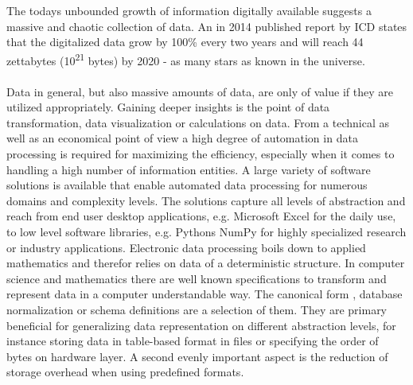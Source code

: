 The todays unbounded growth of information digitally available suggests a massive and chaotic collection of data. An in 2014 published report by ICD states that the digitalized data grow by 100\% every two years and will reach 44 zettabytes (10\textsuperscript{21} bytes) by 2020 - as many stars as known in the universe\cite{data_growth_2014}.
\\\\
Data in general, but also massive amounts of data, are only of value if they are utilized appropriately. Gaining deeper insights is the point of data transformation, data visualization or calculations on data. From a technical as well as an economical point of view a high degree of automation in data processing is required for maximizing the efficiency, especially when it comes to handling a high number of information entities\cite{labrinidis_jagadish_2012}. A large variety of software solutions is available that enable automated data processing for numerous domains and complexity levels. The solutions capture all levels of abstraction and reach from end user desktop applications, e.g. Microsoft Excel\cite{excel_2017} for the daily use, to low level software libraries, e.g. Pythons NumPy\cite{numpy_2017} for highly specialized research or industry applications. Electronic data processing boils down to applied mathematics and therefor relies on data of a deterministic structure. In computer science and mathematics there are well known specifications to transform and represent data in a computer understandable way. The canonical form \cite[p. 91 - 96]{dorst_doran_lasenby_2012}, database normalization \cite[p. 743]{halpin_tony_morgan_2010}or schema definitions \cite[p. 62]{halpin_tony_morgan_2010} are a selection of them. They are primary beneficial for generalizing data representation on different abstraction levels, for instance storing data in table-based format in files or specifying the order of bytes on hardware layer. A second evenly important aspect is the reduction of storage overhead when using predefined formats.
\\\\

